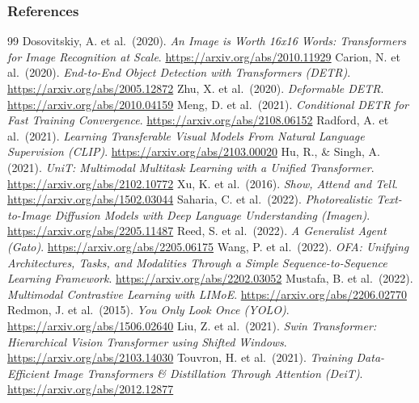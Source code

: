 \begin{vbframe}
\frametitle{References}
\footnotesize{
\begin{thebibliography}{99}
 Dosovitskiy, A. et al.\ (2020). \textit{An Image is Worth 16x16 Words: Transformers for Image Recognition at Scale}. \url{https://arxiv.org/abs/2010.11929}
 Carion, N. et al.\ (2020). \textit{End-to-End Object Detection with Transformers (DETR)}. \url{https://arxiv.org/abs/2005.12872}
 Zhu, X. et al.\ (2020). \textit{Deformable DETR}. \url{https://arxiv.org/abs/2010.04159}
 Meng, D. et al.\ (2021). \textit{Conditional DETR for Fast Training Convergence}. \url{https://arxiv.org/abs/2108.06152}
 Radford, A. et al.\ (2021). \textit{Learning Transferable Visual Models From Natural Language Supervision (CLIP)}. \url{https://arxiv.org/abs/2103.00020}
 Hu, R., \& Singh, A. (2021). \textit{UniT: Multimodal Multitask Learning with a Unified Transformer}. \url{https://arxiv.org/abs/2102.10772}
 Xu, K. et al.\ (2016). \textit{Show, Attend and Tell}. \url{https://arxiv.org/abs/1502.03044}
 Saharia, C. et al.\ (2022). \textit{Photorealistic Text-to-Image Diffusion Models with Deep Language Understanding (Imagen)}. \url{https://arxiv.org/abs/2205.11487}
 Reed, S. et al.\ (2022). \textit{A Generalist Agent (Gato)}. \url{https://arxiv.org/abs/2205.06175}
 Wang, P. et al.\ (2022). \textit{OFA: Unifying Architectures, Tasks, and Modalities Through a Simple Sequence-to-Sequence Learning Framework}. \url{https://arxiv.org/abs/2202.03052}
 Mustafa, B. et al.\ (2022). \textit{Multimodal Contrastive Learning with LIMoE}. \url{https://arxiv.org/abs/2206.02770}
 Redmon, J. et al.\ (2015). \textit{You Only Look Once (YOLO)}. \url{https://arxiv.org/abs/1506.02640}
 Liu, Z. et al.\ (2021). \textit{Swin Transformer: Hierarchical Vision Transformer using Shifted Windows}. \url{https://arxiv.org/abs/2103.14030}
 Touvron, H. et al.\ (2021). \textit{Training Data-Efficient Image Transformers \& Distillation Through Attention (DeiT)}. \url{https://arxiv.org/abs/2012.12877}

\end{thebibliography}}
\end{vbframe}
